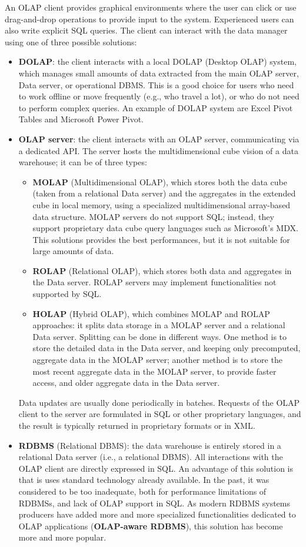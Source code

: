 An OLAP client provides graphical environments where the user can click or use drag-and-drop operations to provide input to the system. Experienced users can also write explicit SQL queries. The client can interact with the data manager using one of three possible solutions:
\begin{itemize}
    \item \textbf{DOLAP}: the client interacts with a local DOLAP (Desktop OLAP) system, which manages small amounts of data extracted from the main OLAP server, Data server, or operational DBMS. This is a good choice for users who need to work offline or move frequently (e.g., who travel a lot), or who do not need to perform complex queries. An example of DOLAP system are Excel Pivot Tables and Microsoft Power Pivot.
    \item \textbf{OLAP server}: the client interacts with an OLAP server, communicating via a dedicated API. The server hosts the multidimensional cube vision of a data warehouse; it can be of three types:
        \begin{itemize}
            \item \textbf{MOLAP} (Multidimensional OLAP), which stores both the data cube (taken from a relational Data server) and the aggregates in the extended cube in local memory, using a specialized multidimensional array-based data structure. MOLAP servers do not support SQL; instead, they support proprietary data cube query languages such as Microsoft's MDX. This solutions provides the best performances, but it is not suitable for large amounts of data.
            \item \textbf{ROLAP} (Relational OLAP), which stores both data and aggregates in the Data server. ROLAP servers may implement functionalities not supported by SQL.
            \item \textbf{HOLAP} (Hybrid OLAP), which combines MOLAP and ROLAP approaches: it splits data storage in a MOLAP server and a relational Data server. Splitting can be done in different ways. One method is to store the detailed data in the Data server, and keeping only precomputed, aggregate data in the MOLAP server; another method is to store the most recent aggregate data in the MOLAP server, to provide faster access, and older aggregate data in the Data server.
        \end{itemize}
        Data updates are usually done periodically in batches. Requests of the OLAP client to the server are formulated in SQL or other proprietary languages, and the result is typically returned in proprietary formats or in XML.
        \item \textbf{RDBMS} (Relational DBMS): the data warehouse is entirely stored in a relational Data server (i.e., a relational DBMS). All interactions with the OLAP client are directly expressed in SQL. An advantage of this solution is that is uses standard technology already available. In the past, it was considered to be too inadequate, both for performance limitations of RDBMSs, and lack of OLAP support in SQL. As modern RDBMS systems producers have added more and more specialized functionalities dedicated to OLAP applications (\textbf{OLAP-aware RDBMS}), this solution has become more and more popular.
\end{itemize}

